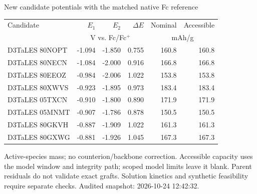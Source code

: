 \begin{frame}{New candidate potentials with the matched native Fc reference}
\scriptsize\renewcommand{\arraystretch}{1.25}\centering
\begin{tabular}{@{}p{4.7cm}rrrrr@{}}\toprule
Candidate & $E_1$ & $E_2$ & $\Delta E$ & Nominal & Accessible \\
& \multicolumn{3}{c}{V vs. Fc/Fc$^+$} & \multicolumn{2}{c}{mAh/g} \\ \midrule
D3TaLES 80NOPT & -1.094 & -1.850 & 0.755 & 160.8 & 160.8 \\
D3TaLES 80NECN & -1.084 & -2.000 & 0.916 & 166.8 & 166.8 \\
D3TaLES 80EEOZ & -0.984 & -2.006 & 1.022 & 153.8 & 153.8 \\
D3TaLES 80XWVS & -0.923 & -1.895 & 0.973 & 183.4 & 183.4 \\
D3TaLES 05TXCN & -0.910 & -1.800 & 0.890 & 171.9 & 171.9 \\
D3TaLES 05MNMT & -0.907 & -1.786 & 0.878 & 150.5 & 150.5 \\
D3TaLES 80GKVH & -0.887 & -1.909 & 1.022 & 161.3 & 161.3 \\
D3TaLES 80GXWG & -0.881 & -1.926 & 1.045 & 167.3 & 167.3 \\
\bottomrule\end{tabular}\par
\vspace{1ex}\raggedright
\footnotesize Active-species mass; no counterion/backbone correction. Accessible capacity uses the model window and integrity path; scoped model limits leave it blank.
\vspace{1ex}\scriptsize Parent residuals do not validate exact grafts. Solution kinetics and synthetic feasibility require separate checks.
\vfill\scriptsize Audited snapshot: 2026-10-24 12:42:32.
\end{frame}
